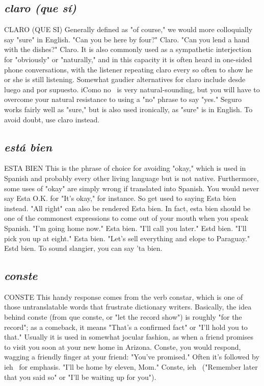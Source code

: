 \documentclass[14pt,a4paper,oneside]{memoir}
\begin{document}
\subsection{\emph{claro (que sí)}}
CLARO (QUE SI)
Generally defined as "of course," we would more colloquially
say "sure" in English. "Can you be here by four?" Claro. "Can you
lend a hand with the dishes?" Claro. It is also commonly used as a
sympathetic interjection for "obviously" or "naturally," and in this capacity it is often heard in one-sided phone conversations, with the listener repeating claro every so often to show he or she is still listening.
Somewhat gaudier alternatives for claro include desde luego and por
supuesto. iComo no~ is very natural-sounding, but you will have to
overcome your natural resistance to using a "no" phrase to say "yes."
Seguro works fairly well as "sure," but is also used ironically, as "sure"
is in English. To avoid doubt, use claro instead.
\subsection{\emph{está bien}}
ESTA BIEN
This is the phrase of choice for avoiding "okay," which is used
in Spanish and probably every other living language but is not native.
Furthermore, some uses of "okay" are simply wrong if translated into
Spanish. You would never say Esta O.K. for "It's okay," for instance. So
get used to saying Esta bien instead. "All right" can also be rendered
Esta bien. In fact, esta bien should be one of the commonest expressions to come out of your mouth when you speak Spanish. "I'm going
home now." Esta bien. "I'll call you later." Estd bien. "I'll pick you up
at eight." Esta bien. "Let's sell everything and elope to Paraguay." Estd
bien. To sound slangier, you can say 'ta bien.
\subsection{\emph{conste}}
CONSTE
This handy response comes from the verb constar, which is
one of those untranslatable words that frustrate dictionary writers.
Basically, the idea behind conste (from que conste, or "let the record
show") is roughly "for the record"; as a comeback, it means "That's a
confirmed fact" or "I'll hold you to that." Usually it is used in somewhat jocular fashion, as when a friend promises to visit you soon at
your new home in Arizona. Conste, you would respond, wagging a
friendly finger at your friend: "You've promised." Often it's followed
by ieh~ for emphasis. "I'll be home by eleven, Mom." Conste, ieh~
("Remember later that you said so" or "I'll be waiting up for you").
\end{document}
